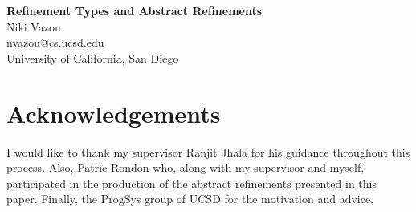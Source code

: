 \documentclass[runningheads,a4paper]{article}
\makeatletter
\newcommand{\at}{\makeatletter @\makeatother}
\newcommand\mytitle{Refinement Types and Abstract Refinements}
\newcommand\myauthor{Niki Vazou}
\newcommand\institution{University of California, San Diego}
\newcommand\myemail{nvazou\at cs.ucsd.edu}
\newcommand{\mymaketitle}{
  \begin{center}
  	{\LARGE\bf \mytitle \\ \vspace{1cm}}%
    {\Large \myauthor \\}%
 	{\large \myemail \\}%
  	{\large \institution \\}%
  \end{center}
  \par}
\makeatother
\begin{document}
\mymaketitle
\begin{abstract}

\end{abstract}







\section*{Acknowledgements}
I would like to thank my supervisor Ranjit Jhala for his guidance throughout this process. 
Also, Patric Rondon who, along with my supervisor and myself, 
participated in the production of the abstract refinements presented in this paper. 
Finally, the ProgSys group of UCSD for the motivation and advice.

{


}
\end{document}
